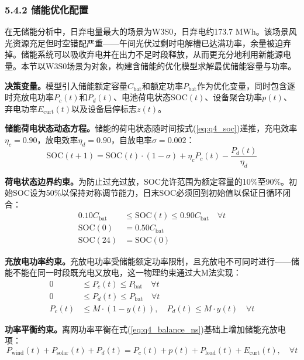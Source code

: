 \documentclass[zihao=-4,a4paper]{ctexart} %
\begin{document}
	\subsubsection*{5.4.2 储能优化配置}
	
	在无储能分析中，日弃电量最大的场景为W3S0，日弃电约173.7 MWh。该场景风光资源充足但时空错配严重——午间光伏过剩时电解槽已达满功率，余量被迫弃掉。储能系统可以吸收弃电并在出力不足时段释放，从而更充分地利用新能源电量。本节以W3S0场景为对象，构建含储能的优化模型求解最优储能容量与功率。
	
	\textbf{决策变量。}模型引入储能额定容量$C_{\text{bat}}$和额定功率$P_{\text{bat}}$作为优化变量，同时包含逐时充放电功率$P_c(t)$和$P_d(t)$、电池荷电状态$\text{SOC}(t)$、设备聚合功率$p(t)$、弃电功率$E_{\text{curt}}(t)$以及设备启停标志$z(t)$。
	
	\textbf{储能荷电状态动态方程。}储能的荷电状态随时间按式(\ref{eq:q4_soc})递推，充电效率$\eta_c=0.90$，放电效率$\eta_d=0.90$，自放电率$\sigma=0.002$：
	\begin{equation}
		\text{SOC}(t+1) = \text{SOC}(t) \cdot (1-\sigma) + \eta_c P_c(t) - \frac{P_d(t)}{\eta_d}
		\label{eq:q4_soc}
	\end{equation}
	
	\textbf{荷电状态边界约束。}为防止过充过放，SOC允许范围为额定容量的10\%至90\%。初始SOC设为50\%以保持对称调节能力，日末SOC必须回到初始值以保证日循环闭合：
	\begin{align}
		0.10 C_{\text{bat}} &\leq \text{SOC}(t) \leq 0.90 C_{\text{bat}} \quad \forall t \label{eq:q4_soc_bound} \\
		\text{SOC}(0) &= 0.50 C_{\text{bat}} \label{eq:q4_soc_init} \\
		\text{SOC}(24) &= \text{SOC}(0) \label{eq:q4_soc_term}
	\end{align}
	
	\textbf{充放电功率约束。}充放电功率受储能额定功率限制，且充放电不可同时进行——储能不能在同一时段既充电又放电，这一物理约束通过大M法实现：
	\begin{align}
		0 &\leq P_c(t) \leq P_{\text{bat}} \quad \forall t \label{eq:q4_pc} \\
		0 &\leq P_d(t) \leq P_{\text{bat}} \quad \forall t \label{eq:q4_pd} \\
		P_c(t) &\leq M \cdot (1 - y(t)), \quad P_d(t) \leq M \cdot y(t) \quad \forall t \label{eq:q4_mutex}
	\end{align}
	
	\textbf{功率平衡约束。}离网功率平衡在式(\ref{eq:q4_balance_ns})基础上增加储能充放电项：
	\begin{equation}
		P_{\text{wind}}(t) + P_{\text{solar}}(t) + P_d(t) = P_c(t) + p(t) + P_{\text{load}}(t) + E_{\text{curt}}(t), \quad \forall t
		\label{eq:q4_balance}
	\end{equation}
	
\end{document}
